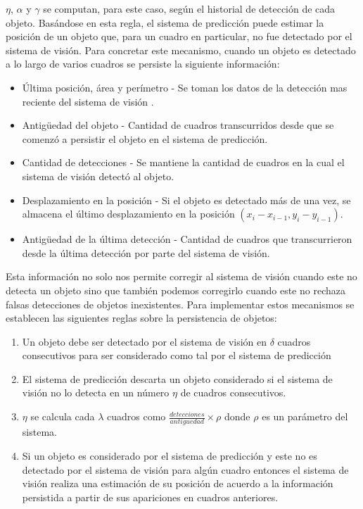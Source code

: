 $\eta$, $\alpha$ y $\gamma$ se computan, para este caso, según el 
historial de detección de cada objeto.  Basándose en esta regla, el 
sistema de predicción puede estimar la posición de un objeto que, 
para un cuadro en particular, no fue detectado por el sistema de 
visión. Para concretar este mecanismo, cuando un objeto es detectado a lo largo de varios cuadros se persiste la siguiente información:
\begin{itemize}
\item{ Última posición, área y perímetro - Se toman los datos de la detección mas reciente del sistema de visión .}
\item{ Antigüedad del objeto - Cantidad de cuadros transcurridos desde que se comenzó a persistir el objeto en el sistema de predicción.}
\item{ Cantidad de detecciones - Se mantiene la cantidad de cuadros en la cual el sistema de visión detectó al objeto.}
\item{ Desplazamiento en la posición - Si el objeto es detectado más 
de una vez, se almacena el último desplazamiento en la posición $(x_i - 
x_{i-1} , y_i - y_{i-1} )$.}
\item{ Antigüedad de la última detección - Cantidad de cuadros que transcurrieron desde la última detección por parte del sistema de visión.}  
\end{itemize}
Esta información no solo nos permite corregir al sistema de visión 
cuando este no detecta un objeto sino que también podemos corregirlo 
cuando este no rechaza falsas detecciones de objetos inexistentes. Para 
implementar estos mecanismos se establecen las siguientes reglas sobre 
la persistencia de objetos:
\begin{enumerate}
\item{Un objeto debe ser detectado por el sistema de visión en $\delta$ 
cuadros consecutivos para ser considerado como tal por el sistema de 
predicción}
\item{El sistema de predicción descarta un objeto considerado si el 
sistema de visión no lo detecta en un número $\eta$ de cuadros 
consecutivos.}
\item{ $\eta$ se calcula cada $\lambda$ cuadros como 
$\frac{detecciones}{antiguedad}\times \rho$ donde $\rho$ es un parámetro del 
sistema}.
\item{ Si un objeto es considerado por el sistema de predicción y este 
no es detectado por el sistema de visión para algún cuadro entonces 
el sistema de visión realiza una estimación de su posición de 
acuerdo a la información persistida a partir de sus apariciones en cuadros anteriores.}
\end{enumerate}

